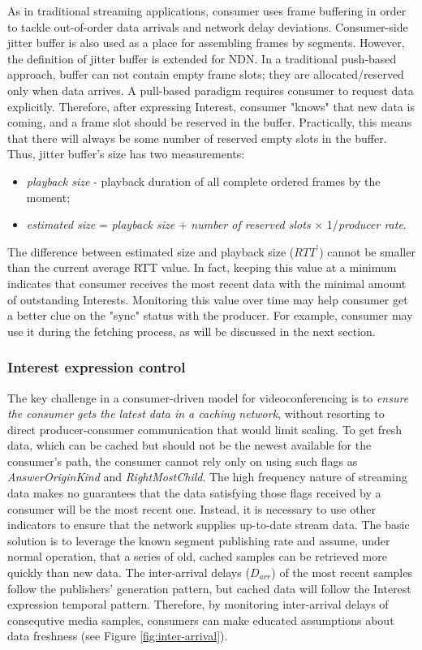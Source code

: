 \documentclass{icn/sig-alternate-2012} %
\begin{document}
As in traditional streaming applications, consumer uses frame buffering in order to tackle out-of-order data arrivals and network delay deviations. Consumer-side jitter buffer is also used as a place for assembling frames by segments. However, the definition of jitter buffer is extended for NDN. In a traditional push-based approach, buffer can not contain empty frame slots; they are allocated/reserved only when data arrives. A pull-based paradigm requires consumer to request data explicitly. Therefore, after expressing Interest, consumer "knows" that new data is coming, and a frame slot should be reserved in the buffer. Practically, this means that there will always be some number of reserved empty slots in the buffer. Thus, jitter buffer's size has two measurements:
\begin{itemize}[label={}]
\item \textit{playback size} - playback duration of all complete ordered frames by the moment;
\item \textit{estimated size} = \textit{playback size} + \textit{number of reserved slots} $\times$ 1/\textit{producer rate}.
\end{itemize}

The difference between estimated size and playback size ($RTT^{\prime}$) cannot be smaller than the current average RTT value. In fact, keeping this value at a minimum indicates that consumer receives the most recent data with the minimal amount of outstanding Interests. Monitoring this value over time may help consumer get a better clue on the "sync" status with the producer. For example, consumer may use it during the fetching process, as will be discussed in the next section. 

\subsubsection{Interest expression control}

The key challenge in a consumer-driven model for videoconferencing is to \emph{ensure the consumer gets the latest data in a caching network}, without resorting to direct producer-consumer communication that would limit scaling. To get fresh data, which can be cached but should not be the newest available for the consumer's path,  the consumer cannot rely only on using such flags as \textit{AnswerOriginKind} and \textit{RightMostChild}. The high frequency nature of streaming data makes no guarantees that the data satisfying those flags received by a consumer will be the most recent one. Instead, it is necessary to use other indicators to ensure that the network supplies up-to-date stream data. The basic solution is to leverage the known segment publishing rate and assume, under normal operation, that a series of old, cached samples can be retrieved more quickly than new data. The inter-arrival delays ($D_{arr}$) of the most recent samples follow the publishers' generation pattern, but cached data will follow the Interest expression temporal pattern. Therefore, by monitoring inter-arrival delays of consequtive media samples, consumers can make educated assumptions about data freshness (see Figure \ref{fig:inter-arrival}).
\end{document}
